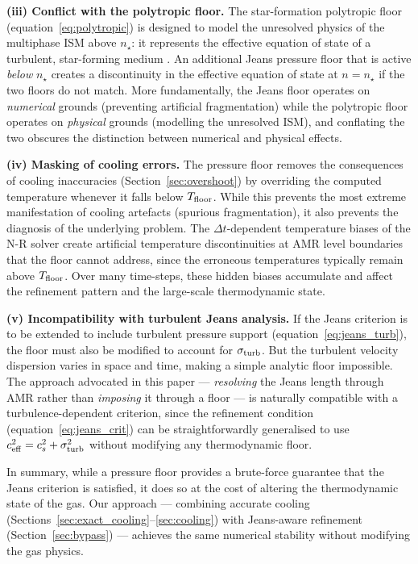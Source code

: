 \documentclass[fleqn,usenatbib]{mnras}
\newcommand{\nstar}{n_\star}
\begin{document}
\textbf{(iii) Conflict with the polytropic floor.}
The star-formation polytropic floor (equation~\ref{eq:polytropic}) is
designed to model the unresolved physics of the multiphase ISM above
$\nstar$: it represents the effective equation of state of a turbulent,
star-forming medium \citep{Schaye2015}.  An additional Jeans pressure
floor that is active \emph{below} $\nstar$ creates a discontinuity in
the effective equation of state at $n = \nstar$ if the two floors do
not match.  More fundamentally, the Jeans floor operates on
\emph{numerical} grounds (preventing artificial fragmentation) while
the polytropic floor operates on \emph{physical} grounds (modelling
the unresolved ISM), and conflating the two obscures the distinction
between numerical and physical effects.

\textbf{(iv) Masking of cooling errors.}
The pressure floor removes the consequences of cooling inaccuracies
(Section~\ref{sec:overshoot}) by overriding the computed temperature
whenever it falls below $T_{\rm floor}$.  While this prevents the
most extreme manifestation of cooling artefacts (spurious
fragmentation), it also prevents the diagnosis of the underlying
problem.  The $\Delta t$-dependent temperature biases of the N-R
solver create artificial temperature discontinuities at AMR level
boundaries that the floor cannot address, since the erroneous
temperatures typically remain above $T_{\rm floor}$.  Over many
time-steps, these hidden biases accumulate and affect the refinement
pattern and the large-scale thermodynamic state.

\textbf{(v) Incompatibility with turbulent Jeans analysis.}
If the Jeans criterion is to be extended to include turbulent pressure
support (equation~\ref{eq:jeans_turb}), the floor must also be
modified to account for $\sigma_{\rm turb}$.  But the turbulent
velocity dispersion varies in space and time, making a simple analytic
floor impossible.  The approach advocated in this paper --- \emph{resolving}
the Jeans length through AMR rather than \emph{imposing} it through a
floor --- is naturally compatible with a turbulence-dependent criterion,
since the refinement condition (equation~\ref{eq:jeans_crit}) can be
straightforwardly generalised to use $c_{\rm eff}^2 = c_s^2 +
\sigma_{\rm turb}^2$ without modifying any thermodynamic floor.

In summary, while a pressure floor provides a brute-force guarantee
that the Jeans criterion is satisfied, it does so at the cost of
altering the thermodynamic state of the gas.  Our approach ---
combining accurate cooling (Sections~\ref{sec:exact_cooling}--\ref{sec:cooling}) with
Jeans-aware refinement (Section~\ref{sec:bypass}) --- achieves the
same numerical stability without modifying the gas physics.
\end{document}
